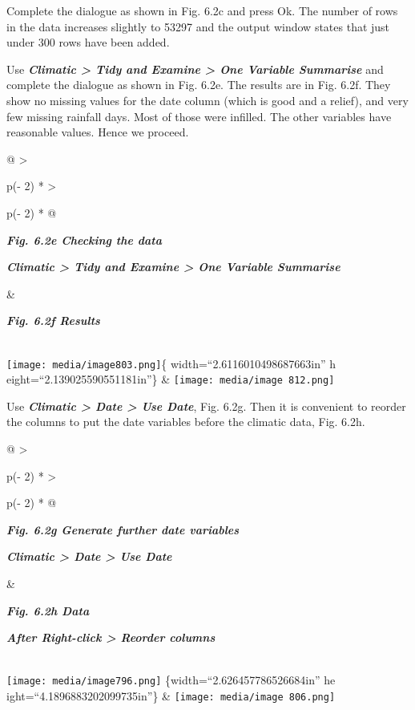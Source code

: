 \documentclass[
  letterpaper,
  DIV=11,
  numbers=noendperiod]{scrreprt}
\begin{document}
Complete the dialogue as shown in Fig. 6.2c and press Ok. The number of
rows in the data increases slightly to 53297 and the output window
states that just under 300 rows have been added.

Use \textbf{\emph{Climatic \textgreater{} Tidy and Examine
\textgreater{} One Variable Summarise}} and complete the dialogue as
shown in Fig. 6.2e. The results are in Fig. 6.2f. They show no missing
values for the date column (which is good and a relief), and very few
missing rainfall days. Most of those were infilled. The other variables
have reasonable values. Hence we proceed.

\begin{longtable}[]{@{}
  >{\raggedright\arraybackslash}p{(\columnwidth - 2\tabcolsep) * }
  >{\raggedright\arraybackslash}p{(\columnwidth - 2\tabcolsep) * }@{}}
\toprule\noalign{}
\begin{minipage}[b]{\linewidth}\raggedright
\textbf{\emph{Fig. 6.2e Checking the data}}

\textbf{\emph{Climatic \textgreater{} Tidy and Examine \textgreater{}
One Variable Summarise}}
\end{minipage} & \begin{minipage}[b]{\linewidth}\raggedright
\textbf{\emph{Fig. 6.2f Results}}
\end{minipage} \\
\midrule\noalign{}
\endhead
\bottomrule\noalign{}
\endlastfoot
\texttt{[image: media/image803.png]}\{ width=``2.6116010498687663in'' h
eight=``2.139025590551181in''\} &
\texttt{[image: media/image 812.png]} \\
\end{longtable}

Use \textbf{\emph{Climatic \textgreater{} Date \textgreater{} Use
Date}}, Fig. 6.2g. Then it is convenient to reorder the columns to put
the date variables before the climatic data, Fig. 6.2h.

\begin{longtable}[]{@{}
  >{\raggedright\arraybackslash}p{(\columnwidth - 2\tabcolsep) * }
  >{\raggedright\arraybackslash}p{(\columnwidth - 2\tabcolsep) * }@{}}
\toprule\noalign{}
\begin{minipage}[b]{\linewidth}\raggedright
\textbf{\emph{Fig. 6.2g Generate further date variables}}

\textbf{\emph{Climatic \textgreater{} Date \textgreater{} Use Date}}
\end{minipage} & \begin{minipage}[b]{\linewidth}\raggedright
\textbf{\emph{Fig. 6.2h Data}}

\textbf{\emph{After Right-click \textgreater{} Reorder columns}}
\end{minipage} \\
\midrule\noalign{}
\endhead
\bottomrule\noalign{}
\endlastfoot
\texttt{[image: media/image796.png]} \{width=``2.626457786526684in'' he
ight=``4.1896883202099735in''\} &
\texttt{[image: media/image 806.png]} \\
\end{longtable}
\end{document}
